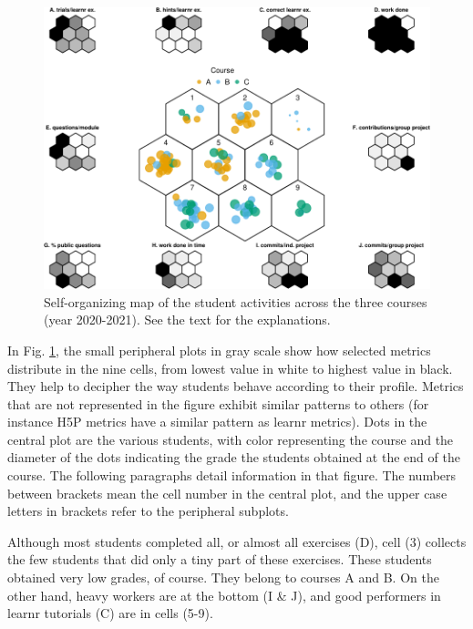 \documentclass{aims}
\theoremstyle{definition}
\begin{document}
\begin{figure}
\includegraphics[width=1\linewidth]{teaching_data_science_files/figure-latex/fig_som-1} \caption{\label{fig:fig_som} Self-organizing map of the student activities across the three courses (year 2020-2021). See the text for the explanations.}\label{fig:fig_som}
\end{figure}

In Fig. \ref {fig:fig_som}, the small peripheral plots in gray scale
show how selected metrics distribute in the nine cells, from lowest
value in white to highest value in black. They help to decipher the way
students behave according to their profile. Metrics that are not
represented in the figure exhibit similar patterns to others (for
instance H5P metrics have a similar pattern as learnr metrics). Dots in
the central plot are the various students, with color representing the
course and the diameter of the dots indicating the grade the students
obtained at the end of the course. The following paragraphs detail
information in that figure. The numbers between brackets mean the cell
number in the central plot, and the upper case letters in brackets refer
to the peripheral subplots.

Although most students completed all, or almost all exercises (D), cell
(3) collects the few students that did only a tiny part of these
exercises. These students obtained very low grades, of course. They
belong to courses A and B. On the other hand, heavy workers are at the
bottom (I \& J), and good performers in learnr tutorials (C) are in
cells (5-9).
\end{document}
